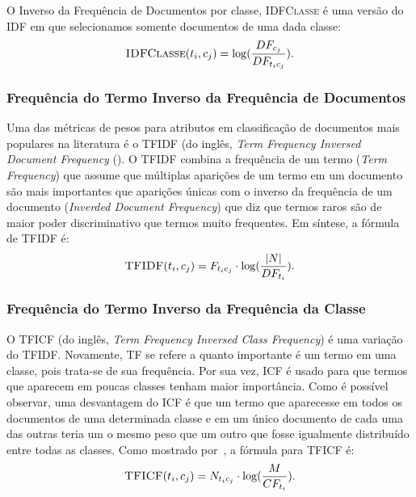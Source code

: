 O Inverso da Frequência de Documentos por classe, \textsc{IDFClasse} é uma versão do \textsc{IDF} em que selecionamos somente documentos de uma dada classe:
\begin{equation}\label{eqn::tficf}
 \textsc{IDFClasse}(t_i,c_j) = \log( \frac{DF_{c_j}} {DF_{t_ic_j} }).
\end{equation}



\subsubsection{Frequência do Termo Inverso da Frequência de Documentos}%
\label{subsubsection::tfidf}

Uma das métricas de pesos para atributos em classificação de documentos mais populares na literatura é o \textsc{TFIDF} (do inglês, \textit{Term Frequency Inversed Document Frequency} (\cite{Salton88}). O \textsc{TFIDF} combina a frequência de um termo (\textit{Term Frequency}) que assume que múltiplas aparições de um termo em um documento são mais importantes que aparições únicas com o inverso da frequência de um documento (\textit{Inverded Document Frequency}) que diz que termos raros são de maior poder discriminativo que termos muito frequentes. Em síntese, a fórmula de \textsc{TFIDF} é:
\begin{equation}\label{eqn::tficf}
 \textsc{TFIDF}(t_i, c_j) =  F_{t_ic_j} \cdot \log( \frac{|N|} {DF_{t_i}} ).
\end{equation}

\subsubsection{Frequência do Termo Inverso da Frequência da Classe}%
\label{subsubsection::tficf}

O \textsc{TFICF} (do inglês, \textit{Term Frequency Inversed Class Frequency}) é uma variação do \textsc{TFIDF}. Novamente, \textsc{TF} se refere a quanto importante é um termo em uma classe, pois trata-se de sua frequência. Por sua vez, \textsc{ICF} é usado para que termos que aparecem em poucas classes tenham maior importância.
Como é possível observar, uma desvantagem do \textsc{ICF} é que um termo que aparecesse em todos os documentos de uma determinada classe e em um único documento de cada uma das outras teria um o mesmo peso que um outro que fosse igualmente distribuído entre todas as classes. 
Como mostrado por~\cite{ChihHow04}, a fórmula para \textsc{TFICF} é:
\begin{equation}\label{eqn::tficf}
 \textsc{TFICF}(t_i, c_j) = N_{t_ic_j} \cdot \log( \frac{M}{CF_{t_i}} ).
\end{equation}

